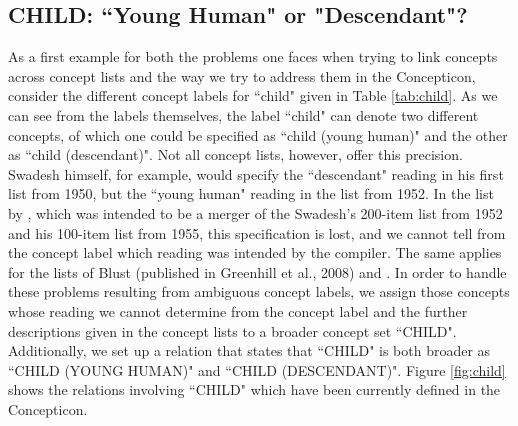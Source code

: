 \documentclass[10pt, a4paper]{article}
\begin{document}
\subsection{CHILD: ``Young Human" or "Descendant"?}
\noindent As a first example for both the problems one faces when trying to link concepts across concept lists and the way we
try to address them in the Concepticon, consider the different concept labels for ``child" given in
Table \ref{tab:child}. As we can see from the labels themselves, the label ``child" can denote two
different concepts, of which one could be specified as ``child (young human)" and the other as
``child (descendant)". Not all concept lists, however, offer this precision. Swadesh himself, for
example, would specify the ``descendant" reading in his first list from 1950, but the ``young human"
reading in the list from 1952. In the list by , which was intended to be a merger of
the Swadesh's 200-item list from 1952 and his 100-item list from 1955, this specification is lost,
and we cannot tell from the concept label which reading was intended by the compiler. The same
applies for the lists of Blust (published in Greenhill et al., 2008) and .  In order to handle
these problems resulting from ambiguous concept labels, we assign those concepts whose reading we
cannot determine from the concept label and the further descriptions given in the concept lists to a
broader concept set ``CHILD". Additionally, we set up a relation that states that ``CHILD" is both
broader as ``CHILD (YOUNG HUMAN)" and ``CHILD (DESCENDANT)". Figure \ref{fig:child} shows the
relations involving ``CHILD" which have been currently defined in the Concepticon.
 
\end{document}
